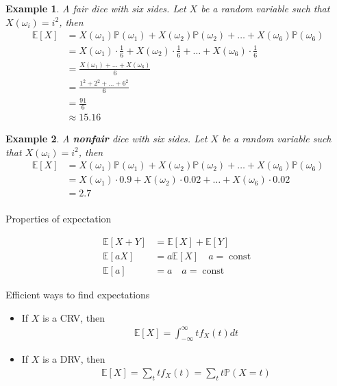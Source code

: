 \documentclass[10pt]{article}
\newtheorem*{example}{Example}
\begin{document}
\begin{example}
    A fair dice with six sides. Let $X$ be a random variable such that
    $X(\omega_i)=i^2$, then
    \begin{align}
        \mathbb{E}[X]
         & =X(\omega_1)\mathbb{P}(\omega_1)
        +X(\omega_2)\mathbb{P}(\omega_2)+
        \ldots+
        X(\omega_6)\mathbb{P}(\omega_6)     \\
         & =X(\omega_1)\cdot\frac{1}{6}
        +X(\omega_2)\cdot\frac{1}{6}+
        \ldots+
        X(\omega_6)\cdot\frac{1}{6}         \\
         & =\frac{X(\omega_1)+
            \ldots+
            X(\omega_6)}{6}                 \\
         & =\frac{1^2+2^2+\ldots+6^2}{6}    \\  %
         & =\frac{91}{6}                    \\
         & \approx 15.16
    \end{align}
\end{example}

\begin{example}
    A \textbf{nonfair} dice with six sides. Let $X$ be a random variable such
    that $X(\omega_i)=i^2$, then
    \begin{align}
        \mathbb{E}[X]
         & =X(\omega_1)\mathbb{P}(\omega_1)+
        X(\omega_2)\mathbb{P}(\omega_2)+
        \ldots+
        X(\omega_6)\mathbb{P}(\omega_6)      \\
         & =X(\omega_1)\cdot 0.9+
        X(\omega_2)\cdot 0.02+
        \ldots+
        X(\omega_6)\cdot 0.02                \\
         & =2.7                              \\
    \end{align}
\end{example}

Properties of expectation

\begin{align}
    \mathbb{E}[X+Y] & =\mathbb{E}[X]+\mathbb{E}[Y]                \\
    \mathbb{E}[aX]  & =a\mathbb{E}[X]\quad a=\operatorname{const} \\
    \mathbb{E}[a]   & =a\quad a=\operatorname{const}
\end{align}

Efficient ways to find expectations
\begin{itemize}
    \item If $X$ is a CRV, then
          \begin{align}
              \mathbb{E}[X]=\int_{-\infty}^\infty tf_X(t)dt
          \end{align}
    \item If $X$ is a DRV, then
          \begin{align}
              \mathbb{E}[X]=\sum_t tf_X(t)=\sum_t t\mathbb{P}(X=t)
          \end{align}
\end{itemize}
\end{document}
